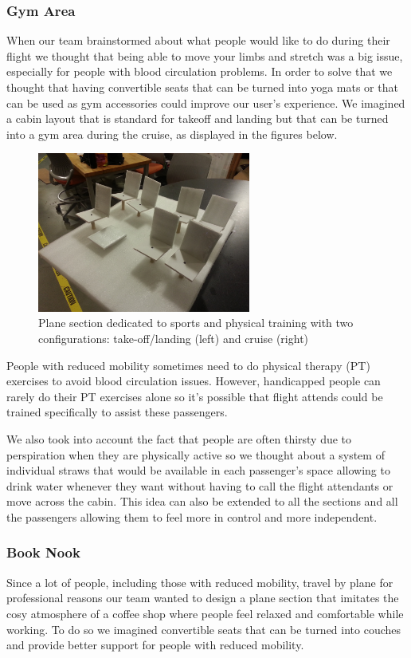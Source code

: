 \subsubsection{Gym Area}
When our team brainstormed about what people would like to do during their flight we thought that being able to move your limbs and stretch was a big issue, especially for people with blood circulation problems. In order to solve that we thought that having convertible seats that can be turned into yoga mats or that can be used as gym accessories could improve our user’s experience. We imagined a cabin layout that is standard for takeoff and landing but that can be turned into a gym area during the cruise, as displayed in the figures below. \\

\begin{figure}[h]
  \centering
     \includegraphics[width=7cm]{images/20140116_172402.jpg}
   \caption{Plane section dedicated to sports and physical training with two configurations: take-off/landing (left) and cruise (right)}
  \label{fig:20140116_172402}
\end{figure}

People with reduced mobility sometimes need to do physical therapy (PT) exercises to avoid blood circulation issues. However, handicapped people can rarely do their PT exercises alone so it’s possible that flight attends could be trained specifically to assist these passengers.

We also took into account the fact that people are often thirsty due to perspiration when they are physically active so we thought about a system of individual straws that would be available in each passenger’s space allowing to drink water whenever they want without having to call the flight attendants or move across the cabin. This idea can also be extended to all the sections and all the passengers allowing them to feel more in control and more independent.

\subsubsection{Book Nook}
Since a lot of people, including those with reduced mobility, travel by plane for professional reasons our team wanted to design a plane section that imitates the cosy atmosphere of a coffee shop where people feel relaxed and comfortable while working.
To do so we imagined convertible seats that can be turned into couches and provide better support for people with reduced mobility. 


